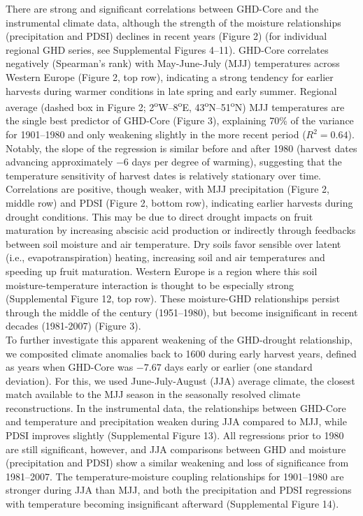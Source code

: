 \documentclass[final]{nature}
\begin{document}
\indent There are strong and significant correlations between GHD-Core and the instrumental climate data, although the strength of the moisture relationships (precipitation and PDSI) declines in recent years (Figure 2) (for individual regional GHD series, see Supplemental Figures 4--11). GHD-Core correlates negatively (Spearman's rank) with May-June-July (MJJ) temperatures across Western Europe (Figure 2, top row), indicating a strong tendency for earlier harvests during warmer conditions in late spring and early summer. Regional average (dashed box in Figure 2; 2\textsuperscript{o}W--8\textsuperscript{o}E, 43\textsuperscript{o}N--51\textsuperscript{o}N) MJJ temperatures are the single best predictor of GHD-Core (Figure 3), explaining 70\% of the variance for 1901--1980 and only weakening slightly in the more recent period ($R^2=0.64$). Notably, the slope of the regression is similar before and after 1980 (harvest dates advancing approximately $-6$ days per degree of warming), suggesting that the temperature sensitivity of harvest dates is relatively stationary over time.\\
\indent Correlations are positive, though weaker, with MJJ precipitation (Figure 2, middle row) and PDSI (Figure 2, bottom row), indicating earlier harvests during drought conditions. This may be due to direct drought impacts on fruit maturation by increasing abscisic acid production\cite{webb2012} or indirectly through feedbacks between soil moisture and air temperature. Dry soils favor sensible over latent (i.e., evapotranspiration) heating, increasing soil and air temperatures and speeding up fruit maturation. Western Europe is a region where this soil moisture-temperature interaction is thought to be especially strong\cite{Seneviratne2006} (Supplemental Figure 12, top row). These moisture-GHD relationships persist through the middle of the century (1951--1980), but become insignificant in recent decades (1981-2007) (Figure 3).\\
\indent To further investigate this apparent weakening of the GHD-drought relationship, we composited climate anomalies back to 1600 during early harvest years, defined as years when GHD-Core was $-7.67$ days early or earlier (one standard deviation). For this, we used June-July-August (JJA) average climate, the closest match available to the MJJ season in the seasonally resolved climate reconstructions. In the instrumental data, the relationships between GHD-Core and temperature and precipitation weaken during JJA compared to MJJ, while PDSI improves slightly (Supplemental Figure 13). All regressions prior to 1980 are still significant, however, and JJA comparisons between GHD and moisture (precipitation and PDSI) show a similar weakening and loss of significance from 1981--2007. The temperature-moisture coupling relationships for 1901--1980 are stronger during JJA than MJJ, and both the precipitation and PDSI regressions with temperature becoming insignificant afterward (Supplemental Figure 14).\\ 
\end{document}
